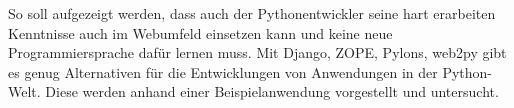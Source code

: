 So soll aufgezeigt werden, dass auch der Pythonentwickler seine hart erarbeiten
Kenntnisse auch im Webumfeld einsetzen kann und keine neue Programmiersprache
dafür lernen muss. Mit Django, ZOPE, Pylons, web2py gibt es genug Alternativen
für die Entwicklungen von Anwendungen in der Python-Welt. Diese werden anhand
einer Beispielanwendung vorgestellt und untersucht.
